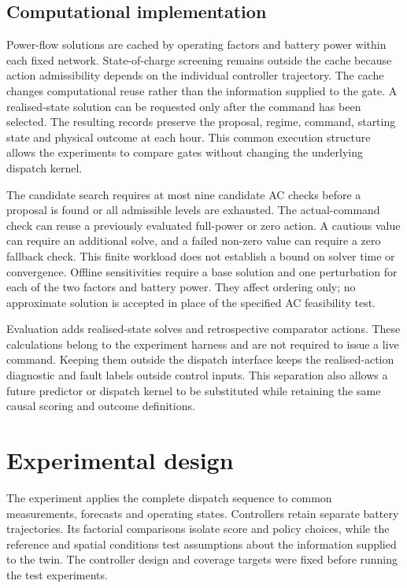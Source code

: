 \documentclass[preprint,12pt]{elsarticle}
\begin{document}
\subsection{Computational implementation}
Power-flow solutions are cached by operating factors and battery power within each fixed network. State-of-charge screening remains outside the cache because action admissibility depends on the individual controller trajectory. The cache changes computational reuse rather than the information supplied to the gate. A realised-state solution can be requested only after the command has been selected. The resulting records preserve the proposal, regime, command, starting state and physical outcome at each hour. This common execution structure allows the experiments to compare gates without changing the underlying dispatch kernel.

The candidate search requires at most nine candidate AC checks before a proposal is found or all admissible levels are exhausted. The actual-command check can reuse a previously evaluated full-power or zero action. A cautious value can require an additional solve, and a failed non-zero value can require a zero fallback check. This finite workload does not establish a bound on solver time or convergence. Offline sensitivities require a base solution and one perturbation for each of the two factors and battery power. They affect ordering only; no approximate solution is accepted in place of the specified AC feasibility test.

Evaluation adds realised-state solves and retrospective comparator actions. These calculations belong to the experiment harness and are not required to issue a live command. Keeping them outside the dispatch interface keeps the realised-action diagnostic and fault labels outside control inputs. This separation also allows a future predictor or dispatch kernel to be substituted while retaining the same causal scoring and outcome definitions.


\section{Experimental design}\label{sec:experiments}
The experiment applies the complete dispatch sequence to common measurements, forecasts and operating states. Controllers retain separate battery trajectories. Its factorial comparisons isolate score and policy choices, while the reference and spatial conditions test assumptions about the information supplied to the twin. The controller design and coverage targets were fixed before running the test experiments.
\end{document}
